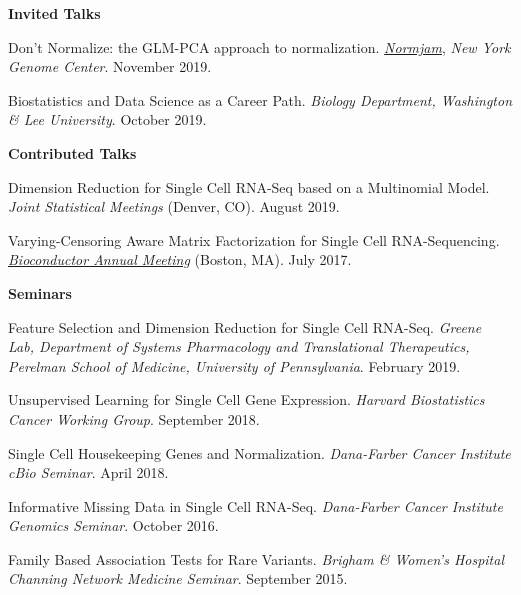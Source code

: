 \documentclass[10pt]{article}
\renewcommand{\section}[2]%
        {\pagebreak[2]\vspace{1.3\baselineskip}%
         \phantomsection\addcontentsline{toc}{section}{#1}%
         \hspace{0in}%
         \marginpar{
         \raggedright \scshape #1}#2}
\begin{document}
\section{Talks}
\textbf{Invited Talks}
\begin{enumerate}[label= {[\arabic*]}]
\item Don't Normalize: the GLM-PCA approach to normalization. \href{https://normjam.github.io/}{{\it Normjam}}, {\it New York Genome Center}. November 2019.
\item Biostatistics and Data Science as a Career Path. {\it Biology Department, Washington \& Lee University}. October 2019.
\end{enumerate}

\textbf{Contributed Talks}
\begin{enumerate}[label= {[\arabic*]}]
\item Dimension Reduction for Single Cell RNA-Seq based on a Multinomial Model. {\it Joint Statistical Meetings} (Denver, CO). August 2019.
\item Varying-Censoring Aware Matrix Factorization for Single Cell RNA-Sequencing. \href{https://www.bioconductor.org/help/course-materials/2017/BioC2017/}{{\it Bioconductor Annual Meeting}} (Boston, MA). July 2017.
\end{enumerate}

\textbf{Seminars}
\begin{enumerate}[label= {[\arabic*]}]
\item Feature Selection and Dimension Reduction for Single Cell RNA-Seq. {\it Greene Lab, Department of Systems Pharmacology and Translational Therapeutics, Perelman School of Medicine, University of Pennsylvania}. February 2019.
\item Unsupervised Learning for Single Cell Gene Expression. {\it Harvard Biostatistics Cancer Working Group}. September 2018.
\item Single Cell Housekeeping Genes and Normalization. {\it Dana-Farber Cancer Institute cBio Seminar}. April 2018.
\item Informative Missing Data in Single Cell RNA-Seq. {\it Dana-Farber Cancer Institute Genomics Seminar}. October 2016.
\item Family Based Association Tests for Rare Variants. {\it Brigham \& Women's Hospital Channing Network Medicine Seminar}. September 2015.
\end{enumerate}
\end{document}

